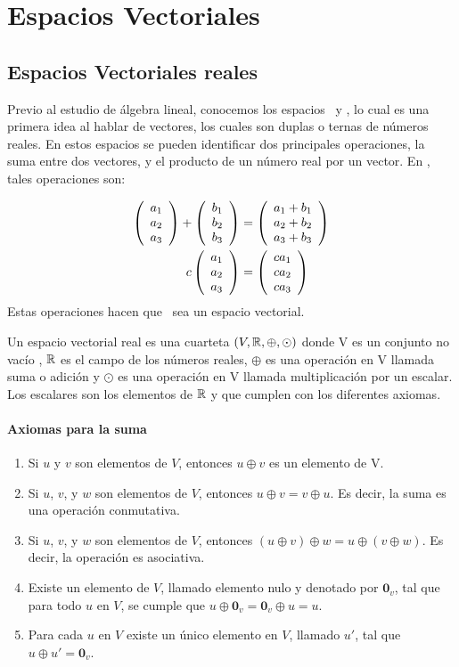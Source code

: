 
\chapter{Espacios Vectoriales}


\section{Espacios Vectoriales reales}
Previo al estudio de álgebra lineal, conocemos los espacios \rdos\ y \rtres, lo cual es una primera idea al hablar de vectores, los cuales son duplas o ternas de números reales. En estos espacios se pueden identificar dos principales operaciones, la suma entre dos vectores, y el producto de un número real por un vector. En \rtres, tales operaciones son:

\begin{align*}
\left( \begin{array}{r} a_1\\ a_2\\ a_3 \end{array} \right) +\left( \begin{array}{r} b_1\\ b_2\\ b_3 \end{array} \right) &=\left( \begin{array}{r} a_1+b_1\\ a_2+b_2\\ a_3+b_3 \end{array} \right) \\
c\left( \begin{array}{r} a_1\\ a_2\\ a_3 \end{array} \right) &=\left( \begin{array}{r} ca_1\\ ca_2\\ ca_3 \end{array} \right) 
\end{align*}
Estas operaciones hacen que \rtres\ sea un espacio vectorial. 
\begin{dfn}
Un espacio vectorial real es una cuarteta $(V, \mathbb{R}, \oplus, \odot)$ donde V es un conjunto no vacío , $\mathbb{R}$ es el campo de los números reales, $\oplus$ es una operación en V llamada suma o adición y $\odot$ es una operación en V llamada multiplicación por un escalar. Los escalares son los elementos de $\mathbb{R}$ y que cumplen con los diferentes axiomas. 


\end{dfn}
\subsubsection*{Axiomas para la suma}
\begin{enumerate}
\item Si $u$ y $v$ son elementos de $V$, entonces $u\oplus v$ es un elemento de V.
\item Si $u$, $v$, y $w$ son elementos de $V$, entonces $u\oplus v=v\oplus u$. Es decir, la suma es una operación conmutativa.
\item Si $u$, $v$, y $w$ son elementos de $V$, entonces  $(u\oplus v)\oplus w=u\oplus(v\oplus w)$. Es decir, la operación es asociativa.
\item Existe un elemento de $V$, llamado elemento nulo y denotado por $\mathbf{0}_v$, tal que para todo $u$ en $V$, se cumple que $u \oplus \mathbf{0}_v = \mathbf{0}_v \oplus u = u$.
\item Para cada $u$ en $V$ existe un único elemento en $V$, llamado $u'$, tal que $u\oplus u'=\mathbf{0}_v$.
\end{enumerate}

